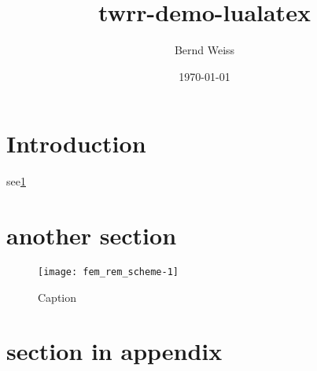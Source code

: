 \documentclass[11pt, paper=a4, ]{scrartcl}
\title{twrr-demo-lualatex}
\author{Bernd Weiss}
\date{\today}
\begin{document}
\maketitle

\tableofcontents

\section{Introduction}

\blindtext[5]

see\ref{fig:my_label}

\section{another section}

\blindtext[5]

\begin{figure}
    \centering
    \texttt{[image: fem\_rem\_scheme-1]}
    \caption{Caption}
    \label{fig:my_label}
\end{figure}

\appendix

\section{section in appendix}
\end{document}
